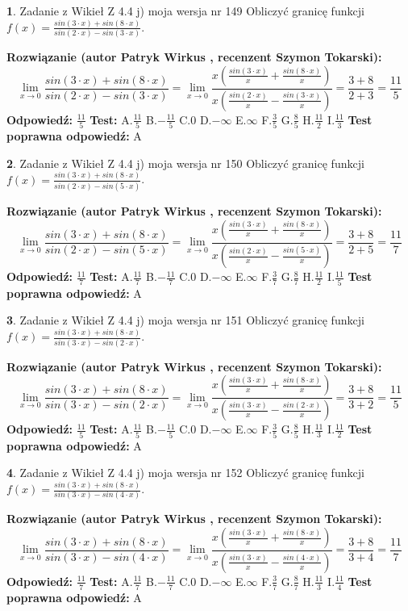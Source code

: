 \documentclass[12pt, a4paper]{article}
\theoremstyle{definition} %
\newtheorem{zad}{}
\newcommand{\zadStart}[1]{\begin{zad}#1\newline}
\newcommand{\zadStop}{\end{zad}}
\newcommand{\rozwStart}[2]{\noindent \textbf{Rozwiązanie (autor #1 , recenzent #2): }\newline}
\newcommand{\rozwStop}{\newline}
\newcommand{\odpStart}{\noindent \textbf{Odpowiedź:}\newline}
\newcommand{\odpStop}{\newline}
\newcommand{\testStart}{\noindent \textbf{Test:}\newline}
\newcommand{\testStop}{\newline}
\newcommand{\kluczStart}{\noindent \textbf{Test poprawna odpowiedź:}\newline}
\newcommand{\kluczStop}{\newline}
\begin{document}
\zadStart{Zadanie z Wikieł Z 4.4 j) moja wersja nr 149}
Obliczyć granicę funkcji $f(x)=\frac{sin(3\cdot x) +sin(8\cdot x)}{sin(2\cdot x) -sin(3\cdot x)}$.
\zadStop
\rozwStart{Patryk Wirkus}{Szymon Tokarski}
$$\lim\limits_{x\to 0}\frac{sin(3\cdot x) +sin(8\cdot x)}{sin(2\cdot x) -sin(3\cdot x)}=\lim\limits_{x\to 0}\frac{x(\frac{sin(3\cdot x)}{x}+\frac{sin(8\cdot x)}{x})}{x(\frac{sin(2\cdot x)}{x}-\frac{sin(3\cdot x)}{x})}=\frac{3+8}{2+3} = \frac{11}{5}$$
\rozwStop
\odpStart
$\frac{11}{5}$
\odpStop
\testStart
A.$\frac{11}{5}$
B.$-\frac{11}{5}$
C.$0$
D.$-\infty$
E.$\infty$
F.$\frac{3}{5}$
G.$\frac{8}{5}$
H.$\frac{11}{2}$
I.$\frac{11}{3}$
\testStop
\kluczStart
A
\kluczStop



\zadStart{Zadanie z Wikieł Z 4.4 j) moja wersja nr 150}
Obliczyć granicę funkcji $f(x)=\frac{sin(3\cdot x) +sin(8\cdot x)}{sin(2\cdot x) -sin(5\cdot x)}$.
\zadStop
\rozwStart{Patryk Wirkus}{Szymon Tokarski}
$$\lim\limits_{x\to 0}\frac{sin(3\cdot x) +sin(8\cdot x)}{sin(2\cdot x) -sin(5\cdot x)}=\lim\limits_{x\to 0}\frac{x(\frac{sin(3\cdot x)}{x}+\frac{sin(8\cdot x)}{x})}{x(\frac{sin(2\cdot x)}{x}-\frac{sin(5\cdot x)}{x})}=\frac{3+8}{2+5} = \frac{11}{7}$$
\rozwStop
\odpStart
$\frac{11}{7}$
\odpStop
\testStart
A.$\frac{11}{7}$
B.$-\frac{11}{7}$
C.$0$
D.$-\infty$
E.$\infty$
F.$\frac{3}{7}$
G.$\frac{8}{7}$
H.$\frac{11}{2}$
I.$\frac{11}{5}$
\testStop
\kluczStart
A
\kluczStop



\zadStart{Zadanie z Wikieł Z 4.4 j) moja wersja nr 151}
Obliczyć granicę funkcji $f(x)=\frac{sin(3\cdot x) +sin(8\cdot x)}{sin(3\cdot x) -sin(2\cdot x)}$.
\zadStop
\rozwStart{Patryk Wirkus}{Szymon Tokarski}
$$\lim\limits_{x\to 0}\frac{sin(3\cdot x) +sin(8\cdot x)}{sin(3\cdot x) -sin(2\cdot x)}=\lim\limits_{x\to 0}\frac{x(\frac{sin(3\cdot x)}{x}+\frac{sin(8\cdot x)}{x})}{x(\frac{sin(3\cdot x)}{x}-\frac{sin(2\cdot x)}{x})}=\frac{3+8}{3+2} = \frac{11}{5}$$
\rozwStop
\odpStart
$\frac{11}{5}$
\odpStop
\testStart
A.$\frac{11}{5}$
B.$-\frac{11}{5}$
C.$0$
D.$-\infty$
E.$\infty$
F.$\frac{3}{5}$
G.$\frac{8}{5}$
H.$\frac{11}{3}$
I.$\frac{11}{2}$
\testStop
\kluczStart
A
\kluczStop



\zadStart{Zadanie z Wikieł Z 4.4 j) moja wersja nr 152}
Obliczyć granicę funkcji $f(x)=\frac{sin(3\cdot x) +sin(8\cdot x)}{sin(3\cdot x) -sin(4\cdot x)}$.
\zadStop
\rozwStart{Patryk Wirkus}{Szymon Tokarski}
$$\lim\limits_{x\to 0}\frac{sin(3\cdot x) +sin(8\cdot x)}{sin(3\cdot x) -sin(4\cdot x)}=\lim\limits_{x\to 0}\frac{x(\frac{sin(3\cdot x)}{x}+\frac{sin(8\cdot x)}{x})}{x(\frac{sin(3\cdot x)}{x}-\frac{sin(4\cdot x)}{x})}=\frac{3+8}{3+4} = \frac{11}{7}$$
\rozwStop
\odpStart
$\frac{11}{7}$
\odpStop
\testStart
A.$\frac{11}{7}$
B.$-\frac{11}{7}$
C.$0$
D.$-\infty$
E.$\infty$
F.$\frac{3}{7}$
G.$\frac{8}{7}$
H.$\frac{11}{3}$
I.$\frac{11}{4}$
\testStop
\kluczStart
A
\kluczStop
\end{document}
